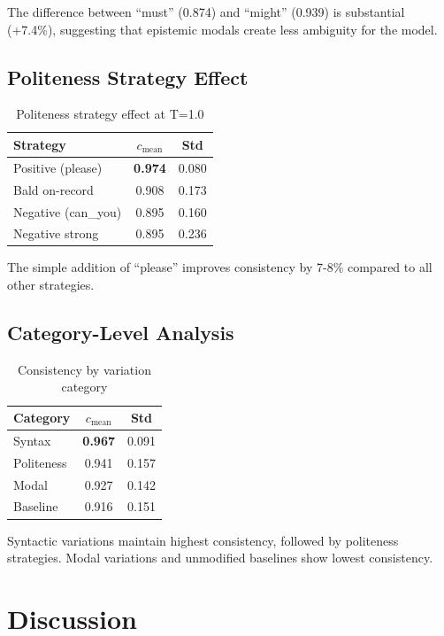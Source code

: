 \documentclass[11pt]{article}
\begin{document}
The difference between ``must'' (0.874) and ``might'' (0.939) is substantial (+7.4\%), suggesting that epistemic modals create less ambiguity for the model.

\subsection{Politeness Strategy Effect}

\begin{table}[h]
\centering
\begin{tabular}{lcc}
\toprule
Strategy & $c_{\text{mean}}$ & Std \\
\midrule
Positive (please) & \textbf{0.974} & 0.080 \\
Bald on-record & 0.908 & 0.173 \\
Negative (can\_you) & 0.895 & 0.160 \\
Negative strong & 0.895 & 0.236 \\
\bottomrule
\end{tabular}
\caption{Politeness strategy effect at T=1.0}
\label{tab:politeness}
\end{table}

The simple addition of ``please'' improves consistency by 7-8\% compared to all other strategies.

\subsection{Category-Level Analysis}

\begin{table}[h]
\centering
\begin{tabular}{lcc}
\toprule
Category & $c_{\text{mean}}$ & Std \\
\midrule
Syntax & \textbf{0.967} & 0.091 \\
Politeness & 0.941 & 0.157 \\
Modal & 0.927 & 0.142 \\
Baseline & 0.916 & 0.151 \\
\bottomrule
\end{tabular}
\caption{Consistency by variation category}
\label{tab:category}
\end{table}

Syntactic variations maintain highest consistency, followed by politeness strategies. Modal variations and unmodified baselines show lowest consistency.

\section{Discussion}
\end{document}

